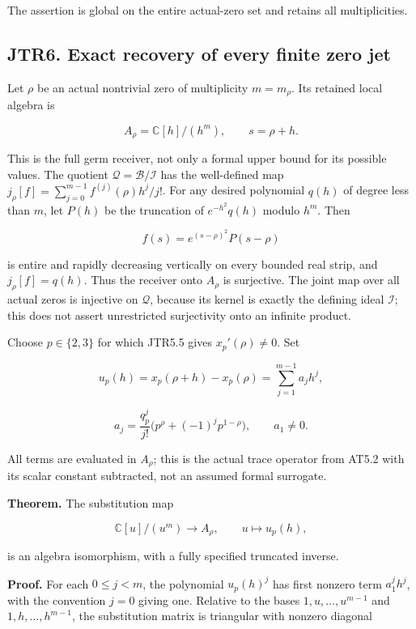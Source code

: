 \documentclass[
]{article}
\begin{document}
The assertion is global on the entire actual-zero set and retains all
multiplicities.

\subsection{JTR6. Exact recovery of every finite zero
jet}\label{jtr6.-exact-recovery-of-every-finite-zero-jet}

Let \(\rho\) be an actual nontrivial zero of multiplicity \(m=m_\rho\).
Its retained local algebra is

\[
A_\rho=\mathbb C[h]/(h^m),\qquad s=\rho+h.
\tag{JTR6.1}
\]

This is the full germ receiver, not only a formal upper bound for its
possible values. The quotient \(\mathcal Q=\mathcal B/\mathcal I\) has
the well-defined map \(j_\rho[f]=\sum_{j=0}^{m-1}f^{(j)}(\rho)h^j/j!\).
For any desired polynomial \(q(h)\) of degree less than \(m\), let
\(P(h)\) be the truncation of \(e^{-h^2}q(h)\) modulo \(h^m\). Then

\[
f(s)=e^{(s-\rho)^2}P(s-\rho)
\]

is entire and rapidly decreasing vertically on every bounded real strip,
and \(j_\rho[f]=q(h)\). Thus the receiver onto \(A_\rho\) is surjective.
The joint map over all actual zeros is injective on \(\mathcal Q\),
because its kernel is exactly the defining ideal \(\mathcal I\); this
does not assert unrestricted surjectivity onto an infinite product.

Choose \(p\in\{2,3\}\) for which JTR5.5 gives \(x_p'(\rho)\ne0\). Set

\[
u_p(h)=x_p(\rho+h)-x_p(\rho)
=\sum_{j=1}^{m-1}a_jh^j,
\]

\[
a_j=\frac{q_p^j}{j!}
\bigl(p^\rho+(-1)^jp^{1-\rho}\bigr),
\qquad a_1\ne0.
\tag{JTR6.2}
\]

All terms are evaluated in \(A_\rho\); this is the actual trace operator
from AT5.2 with its scalar constant subtracted, not an assumed formal
surrogate.

\textbf{Theorem.} The substitution map

\[
\boxed{\mathbb C[u]/(u^m)\longrightarrow A_\rho,
\qquad u\longmapsto u_p(h),}
\tag{JTR6.3}
\]

is an algebra isomorphism, with a fully specified truncated inverse.

\textbf{Proof.} For each \(0\le j<m\), the polynomial \(u_p(h)^j\) has
first nonzero term \(a_1^j h^j\), with the convention \(j=0\) giving
one. Relative to the bases \(1,u,\ldots,u^{m-1}\) and
\(1,h,\ldots,h^{m-1}\), the substitution matrix is triangular with
nonzero diagonal
\end{document}
